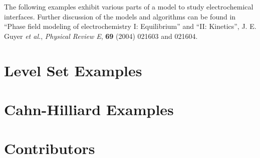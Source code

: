 \documentclass[tocAsPDFpart]{fipy}
\begin{document}
The following examples exhibit various parts of a model to study
electrochemical interfaces.  Further discussion of the models and
algorithms can be found in ``Phase field modeling of electrochemistry
I: Equilibrium'' and ``II: Kinetics'', J. E. Guyer \emph{et al.},
\textit{Physical Review E}, \textbf{69} (2004) 021603 and 021604.


\newpage

\newpage

\newpage

\newpage

\newpage

\newpage

\newpage

\newpage

\newpage

\newpage

\newpage


\chapter{Level Set Examples}


\newpage

\newpage

\newpage

\newpage

\newpage

\newpage

\chapter{Cahn-Hilliard Examples}


\newpage


\backmatter


\fussy

\printindex

\appendix 


\chapter*{Contributors}
\label{chap:Contributors}



\end{document}
